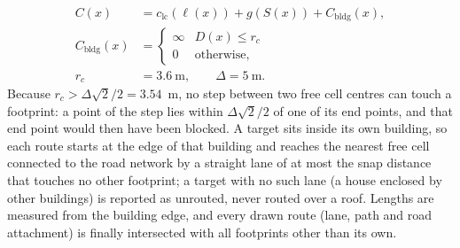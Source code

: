 \documentclass[preprint,12pt]{elsarticle}
\begin{document}
\begin{equation}
\begin{aligned}
C(x)&=c_{\mathrm{lc}}(\ell(x))+g(S(x))+C_{\mathrm{bldg}}(x),\\
C_{\mathrm{bldg}}(x)&=\begin{cases}\infty & D(x)\le r_c\\ 0 & \text{otherwise,}\end{cases}\\
r_c&=3.6\ \mathrm{m},\qquad \Delta=5\ \mathrm{m}.
\end{aligned}
\label{eq:bldg}
\end{equation}
Because $r_c>\Delta\sqrt2/2=3.54$~m, no step between two free cell centres can touch a footprint: a point of the step lies within $\Delta\sqrt2/2$ of one of its end points, and that end point would then have been blocked. A target sits inside its own building, so each route starts at the edge of that building and reaches the nearest free cell connected to the road network by a straight lane of at most the snap distance that touches no other footprint; a target with no such lane (a house enclosed by other buildings) is reported as unrouted, never routed over a roof. Lengths are measured from the building edge, and every drawn route (lane, path and road attachment) is finally intersected with all footprints other than its own.
\end{document}
